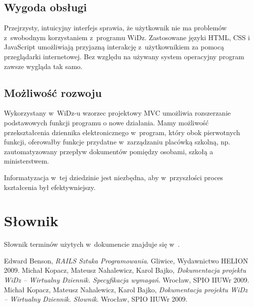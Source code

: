 \documentclass[12pt,leqno,twoside]{mwart}
\begin{document}
\subsection{Wygoda obsługi}
\noindent Przejrzysty, intuicyjny interfejs sprawia, że użytkownik nie ma problemów z~swobodnym korzystaniem z~programu WiDz. Zastosowane języki HTML, CSS i JavaScript umożliwiają przyjazną interakcję z~użytkownikiem za pomocą przeglądarki internetowej. Bez względu na używany system operacyjny program zawsze wygląda tak samo.

\subsection{Możliwość rozwoju}
\noindent Wykorzystany w~WiDz-u wzorzec projektowy MVC umożliwia rozszerzanie podstawowych funkcji programu o nowe działania. Mamy możliwość przekształcenia dziennika elektronicznego w~program, który obok pierwotnych funkcji, oferowałby funkcje przydatne w~zarządzaniu placówką szkolną, np. zautomatyzowany przepływ dokumentów pomiędzy osobami, szkołą a ministerstwem.

\indent Informatyzacja w~tej dziedzinie jest niezbędna, aby w~przyszłości proces kształcenia był efektywniejszy.

\section{Słownik}
\noindent Słownik terminów użytych w~dokumencie znajduje się w~\cite{SLO}.

\begin{thebibliography}{99}
 Edward Benson, {\it RAILS Sztuka Programowania}. Gliwice, Wydawnictwo HELION 2009.
 Michał Kopacz, Mateusz Nahalewicz, Karol Bajko, {\it Dokumentacja projektu WiDz -- Wirtualny Dziennik. Specyfikacja wymagań}. Wrocław, SPIO IIUWr 2009.
 Michał Kopacz, Mateusz Nahalewicz, Karol Bajko, {\it Dokumentacja projektu WiDz -- Wirtualny Dziennik. Słownik}. Wrocław, SPIO IIUWr 2009.
\end{thebibliography}
\end{document}

